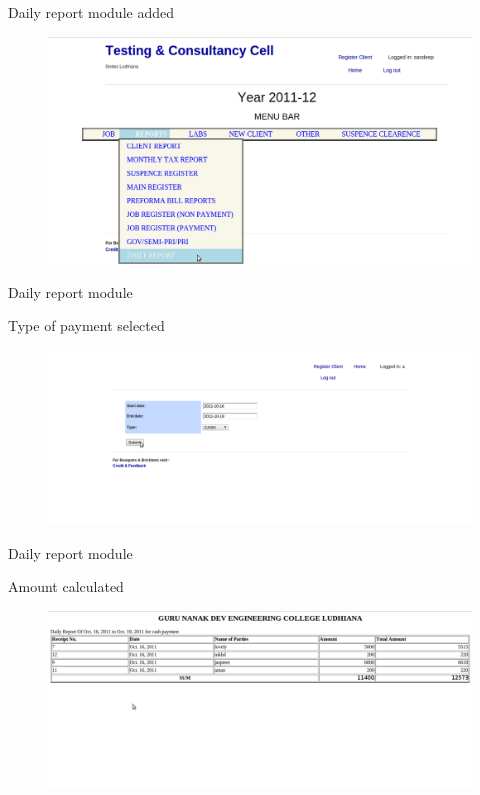 \newpage
\begin{frame}{Daily report module added}
\begin{figure}
\label{imag}
\centering
\includegraphics[scale=0.2]{s1.png}
\end{figure}
\end{frame}
\newpage
\begin{frame}{Daily report module}
\begin{block}{Type of payment selected}
\begin{figure}
\label{imag}
\centering
\includegraphics[scale=0.2]{dp1.png}
\end{figure}
\end{block}
\end{frame}
\newpage
\begin{frame}{Daily report module}
\begin{block}{Amount calculated}
\begin{figure}
\label{imag}
\centering
\includegraphics[scale=0.2]{dp2.png}
\end{figure}
\end{block}
\end{frame}

